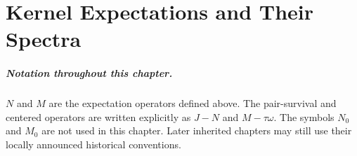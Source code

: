 \chapter{Kernel Expectations and Their Spectra}
\label{organized:operators}
\label{chaptersix}

\paragraph{Notation throughout this chapter.}
$N$ and $M$ are the expectation operators defined above. The pair-survival
and centered operators are written explicitly as $J-N$ and $M-\tau\omega$.
The symbols $N_0$ and $M_0$ are not used in this chapter. Later inherited
chapters may still use their locally announced historical conventions.







